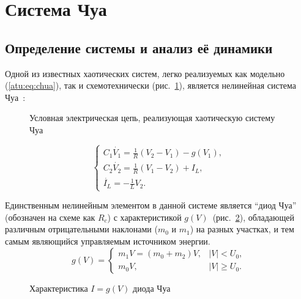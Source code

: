 
\FloatBarrier

\section{Система Чуа} %
\label{atu:sect:chua}


\subsection{Определение системы и анализ её динамики} %

Одной из известных хаотических систем, легко реализуемых как модельно (\ref{atu:eq:chua}),
так и схемотехнически (рис.~\ref{atu:f:chuascheme}),
является нелинейная система Чуа~\cite{moon_chaotic_vibr,buga_chua,Kennedy92robustop}:

\begin{figure}[htb!]
\begin{center}

\end{center}
\caption{Условная электрическая цепь, реализующая хаотическую систему Чуа}
\label{atu:f:chuascheme}
\end{figure}


\begin{equation}
\begin{cases}
  C_1 \dot{V_1}  = \frac{1}{R} ( V_2 - V_1 ) - g(V_1), \\
  C_2 \dot{V_2}  = \frac{1}{R} ( V_1 - V_2 ) + I_L, \\
  \dot{I_L}      = - \frac{1}{L} V_2 .
\end{cases}
\label{atu:eq:chua}
\end{equation}

Единственным нелинейным элементом в данной системе является ``диод Чуа''
(обозначен на схеме как $R_c$) с
характеристикой $g(V)$~(рис.~\ref{atu:f:diodchua}),
обладающей различным отрицательными наклонами
($m_0$ и $m_1$) на разных участках,
и тем самым являющийся управляемым источником энергии.
%
%
\begin{equation}
g(V) =
\begin{cases}
  m_1 V = ( m_0 + m_2 ) V , & |V| <   U_0, \\
  m_0 V ,                   & |V| \ge U_0.
\end{cases}
\label{atu:eq:diodchua}
\end{equation}

\begin{figure}[htb!]
\begin{center}

\end{center}
\caption{Характеристика \(I=g(V)\) диода Чуа}
\label{atu:f:diodchua}
\end{figure}


